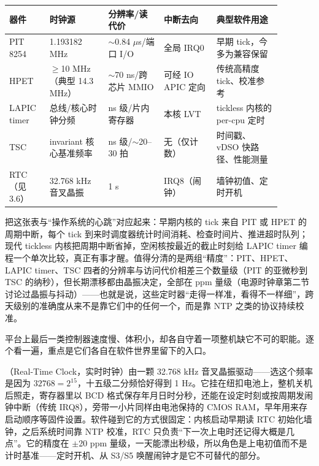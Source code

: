 \begin{longtable}{L{0.13\linewidth}L{0.19\linewidth}L{0.18\linewidth}L{0.17\linewidth}L{0.21\linewidth}}
\toprule
器件 & 时钟源 & 分辨率/读代价 & 中断去向 & 典型软件用途 \\
\midrule
PIT 8254 & 1.193182 MHz & $\sim$0.84 $\mu$s/端口 I/O & 全局 IRQ0 & 早期 tick，今多为兼容保留 \\
HPET & $\geq$10 MHz（典型 14.3 MHz） & $\sim$70 ns/跨芯片 MMIO & 可经 IO APIC 定向 & 传统高精度 tick、校准参考 \\
LAPIC timer & 总线/核心时钟分频 & ns 级/片内寄存器 & 本核 LVT & tickless 内核的 per-cpu 定时 \\
TSC & invariant 核心基准频率 & ns 级/$\sim$20--30 拍 & 无（仅计数） & 时间戳、vDSO 快路径、性能测量 \\
RTC（见 3.6） & 32.768 kHz 音叉晶振 & 1 s & IRQ8（闹钟） & 墙钟初值、定时开机 \\
\bottomrule
\end{longtable}

把这张表与“操作系统的心跳”对应起来：早期内核的 tick 来自 PIT 或 HPET 的周期中断，每个 tick 到来时调度器统计时间消耗、检查时间片、推进超时队列；现代 tickless 内核把周期中断省掉，空闲核按最近的截止时刻给 LAPIC timer 编程一个单次比较，真正有事才醒。值得分清的是两组“精度”：PIT、HPET、LAPIC timer、TSC 四者的分辨率与访问代价相差三个数量级（PIT 的亚微秒到 TSC 的纳秒），但长期漂移都由晶振决定，全部在 ppm 量级（电源时钟章第二节讨论过晶振与抖动）——也就是说，这些定时器“走得一样准，看得不一样细”，跨天级别的准确度从来不是靠它们中的任何一个，而是靠 NTP 之类的协议持续校准。


平台上最后一类控制器速度慢、体积小，却各自守着一项整机缺它不可的职能。逐个看一遍，重点是它们各自在软件世界里留下的入口。

（Real-Time Clock，实时时钟）由一颗 32.768 kHz 音叉晶振驱动——选这个频率是因为 $32768=2^{15}$，十五级二分频恰好得到 1 Hz。它挂在纽扣电池上，整机关机后照走，寄存器里以 BCD 格式保存年月日时分秒，还能在设定时刻或按周期发闹钟中断（传统 IRQ8），旁带一小片同样由电池保持的 CMOS RAM，早年用来存启动顺序等固件设置。软件碰到它的方式很固定：内核启动早期读 RTC 初始化墙钟，之后系统时间靠 NTP 校准，RTC 只负责“下一次上电时还记得大概是几点”。它的精度在 $\pm$20 ppm 量级，一天能漂出秒级，所以角色是上电初值而不是计时基准——定时开机、从 S3/S5 唤醒闹钟才是它不可替代的部分。

